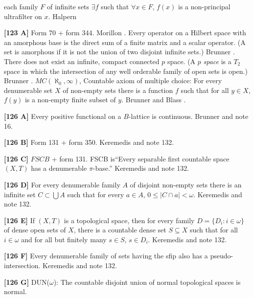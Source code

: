 each family $F$ of infinite sets $\exists f$ such that $\forall x\in F$,
$f(x)$ is a non-principal ultrafilter on $x$. \ac{Halpern} \cite{1972}
\smallskip
\item{}{\bf [123 A]} Form 70 + form 344.  \ac{Morillon} \cite{1988}.
\medskip
{} Every operator on a Hilbert space with an
amorphous base is the direct sum of a finite matrix and  a  scalar
operator.  (A set is amorphous if it is not the union of two disjoint
infinite sets.)  \ac{Brunner} \cite{1984a}.
\medskip
{} There does not exist an infinite, compact connected
$p$ space. (A $p$ {\it space} is a $T_2$ space in which the intersection of
any well orderable family of open sets is open.) \ac{Brunner} \cite{1984c}.
\medskip
{} $MC(\aleph_0,\infty)$, Countable axiom of
multiple choice: For every denumerable set $X$ of non-empty sets there
is a function $f$ such that for all $y\in X$, $f(y)$ is a non-empty finite
subset of $y$. \ac{Brunner} \cite{1984d} and \ac{Blass} \cite{1979}.
\smallskip
\item{}{\bf [126 A]} Every positive functional on a $B$-lattice is
continuous. \ac{Brunner} \cite{1984d} and note 16.
\smallskip
\item{}{\bf [126 B]} Form 131 + form 350. \ac{Keremedis} \cite{1999a} and
note 132.
\smallskip
\item{}{\bf [126 C]} $FSCB$ + form 131.
FSCB is``Every separable first countable space $(X,T)$ has a
denumerable $\pi$-base.'' \ac{Keremedis} \cite{1999a} and note 132.
\smallskip
\item{}{\bf [126 D]} For every denumerable family $A$ of disjoint non-empty
sets there is an infinite set $C\subset\bigcup A$ such that for every
$a\in A$, $0\le|C\cap a|<\omega$. \ac{Keremedis} \cite{1999a} and note 132.
\smallskip
\item{}{\bf [126 E]} If $(X,T)$ is a topological space, then for every
family $D=\{D_i: i\in\omega\}$ of dense open sets of
$X$, there is a countable dense set $S\subseteq X$ such that for all
$i\in\omega$ and for all but finitely many $s\in S$, $s\in D_i$.
\ac{Keremedis} \cite{1999a} and note 132.
\smallskip
\item{}{\bf [126 F]} Every denumerable family of sets having
the sfip also has a pseudo-intersection. \ac{Keremedis} \cite{1999a} and
note 132.
\smallskip
\item{}{\bf [126 G]} DUN($\omega$): The countable disjoint union of
normal topological spaces is normal.
